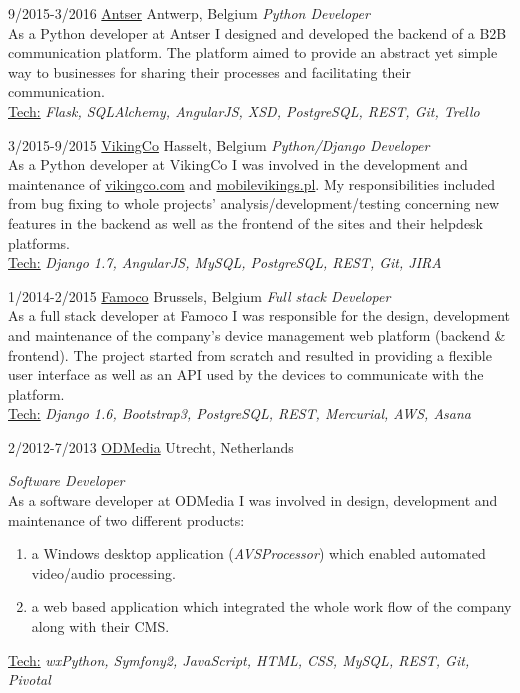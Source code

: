 \documentclass[]{friggeri-cv} %
\begin{document}
\begin{entrylist}


\entry
{9/2015-3/2016}
{\href{http://antser.be}{Antser}}
{Antwerp, Belgium}
{\emph {Python Developer} \\
As a Python developer at Antser I designed and developed the backend of a B2B communication platform. The platform aimed to provide an abstract yet simple way to businesses for sharing their processes and facilitating their communication.\\
\ul{Tech:} \emph{Flask, SQLAlchemy, AngularJS, XSD, PostgreSQL, REST, Git, Trello}
}

\entry
{3/2015-9/2015}
{\href{http://vikingco.com}{VikingCo}}
{Hasselt, Belgium}
{\emph {Python/Django Developer} \\
As a Python developer at VikingCo I was involved in the development and maintenance of \href{https://vikingco.com}{vikingco.com} and \href{https://mobilevikings.pl}{mobilevikings.pl}. My responsibilities included from bug fixing to whole projects' analysis/development/testing concerning new features in the backend as well as the frontend of the sites and their helpdesk platforms.\\
\ul{Tech:} \emph{Django 1.7, AngularJS, MySQL, PostgreSQL, REST, Git, JIRA}
}

\entry
{1/2014-2/2015}
{\href{http://famoco.com}{Famoco}}
{Brussels, Belgium}
{\emph {Full stack Developer} \\
As a full stack developer at Famoco I was responsible for the design, development and maintenance of the company's device management web platform (backend \& frontend). The project started from scratch and resulted in providing a flexible user interface as well as an API used by the devices to communicate with the platform. \\
\ul{Tech:} \emph{Django 1.6, Bootstrap3, PostgreSQL, REST, Mercurial, AWS, Asana}
}

\entry
{2/2012-7/2013}
{\href{http://odmedia.nl}{ODMedia}}
{Utrecht, Netherlands}
{\emph {Software Developer} \\
As a software developer at ODMedia I was involved in design, development and maintenance of two different products:
\begin{enumerate}
\item a Windows desktop application (\emph{AVSProcessor}) which enabled automated video/audio processing.
\item a web based application which integrated the whole work flow of the company along with their CMS.
\end{enumerate}
\ul{Tech:} \emph{wxPython, Symfony2, JavaScript, HTML, CSS, MySQL, REST, Git, Pivotal}
}

\end{entrylist}
\end{document}
